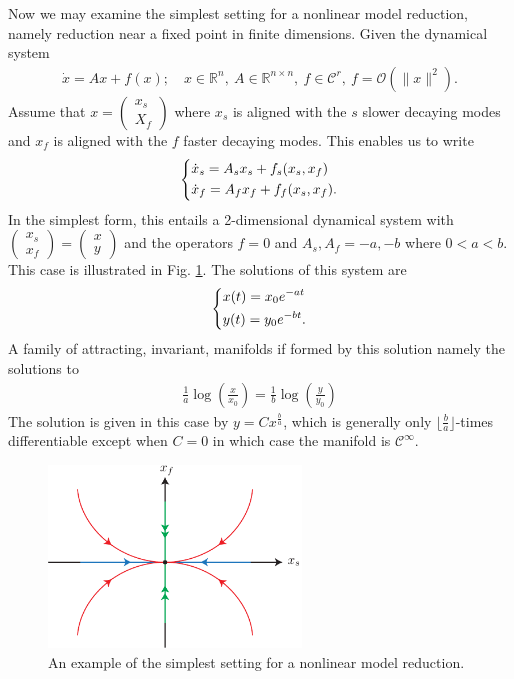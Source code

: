 Now we may examine the simplest setting for a nonlinear model reduction, namely reduction near a fixed point in finite dimensions. Given the dynamical system
\begin{align}
\dot{x} = Ax + f(x);\quad x \in \mathbb{R}^{n},\ A \in \mathbb{R}^{n\times n},\ f\in \mathcal{C}^{r},\ f=\mathcal{O}\left(\|x\|^{2}\right).
\end{align}
Assume that $x=
\begin{pmatrix}
	x_s \\ X_f
\end{pmatrix}
$ where $x_s$ is aligned with the $s$ slower decaying modes and $x_f $ is aligned with the $f$ faster decaying modes. This enables us to write
\begin{align} \label{eq9:approx_inert_mfd}
	\begin{dcases}
		\dot{x}_s = A_{s}x_{s} + f_s(x_s, x_f) \\
		\dot{x}_f = A_{f}x_{f} + f_f(x_s, x_f). 
	\end{dcases}
\end{align}
In the simplest form, this entails a 2-dimensional dynamical system with $
\begin{pmatrix}
	x_s \\ x_f
\end{pmatrix}
=
\begin{pmatrix}
	x \\y
\end{pmatrix}
$ and the operators $f=0$ and $A_s,A_f = -a,-b$ where $0<a<b$. This case is illustrated in Fig. \ref{fig:simplestReduction}. The solutions of this system are
\begin{align}
	\begin{dcases}
		x(t) = x_0 e^{-at} \\
		y(t) = y_0 e^{-bt}.
	\end{dcases}
\end{align}
A family of attracting, invariant, manifolds if formed by this solution namely the solutions to
\begin{align}
	\frac{1}{a}\log\left(\frac{x}{x_0}\right) =\frac{1}{b}\log\left(\frac{y}{y_0}\right)
\end{align}
The solution is given in this case by $y = C x^{\frac{b}{a}}$, which is generally only $\lfloor \frac{b}{a} \rfloor$-times differentiable except when $C=0$ in which case the manifold is $\mathcal{C}^{\infty }$.
\begin{figure}[h!]
	\centering
	\includegraphics[width=0.6\textwidth]{figures/ch9/29simplestReduction.pdf}
	\caption{An example of the simplest setting for a nonlinear model reduction.}
	\label{fig:simplestReduction}
\end{figure}

